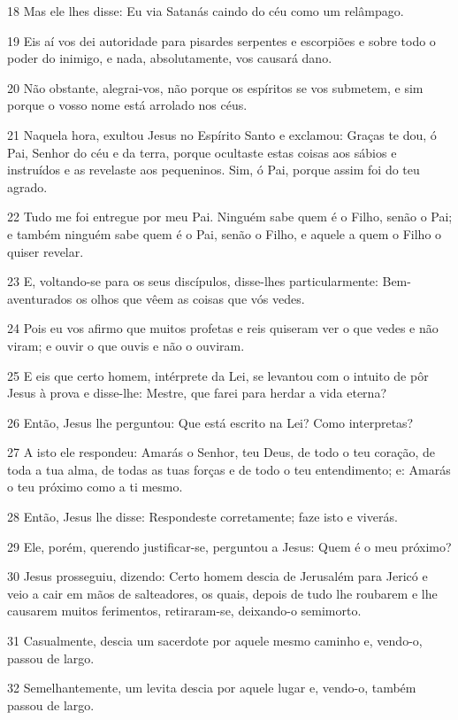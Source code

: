 \par 18 Mas ele lhes disse: Eu via Satanás caindo do céu como um relâmpago.
\par 19 Eis aí vos dei autoridade para pisardes serpentes e escorpiões e sobre todo o poder do inimigo, e nada, absolutamente, vos causará dano.
\par 20 Não obstante, alegrai-vos, não porque os espíritos se vos submetem, e sim porque o vosso nome está arrolado nos céus.
\par 21 Naquela hora, exultou Jesus no Espírito Santo e exclamou: Graças te dou, ó Pai, Senhor do céu e da terra, porque ocultaste estas coisas aos sábios e instruídos e as revelaste aos pequeninos. Sim, ó Pai, porque assim foi do teu agrado.
\par 22 Tudo me foi entregue por meu Pai. Ninguém sabe quem é o Filho, senão o Pai; e também ninguém sabe quem é o Pai, senão o Filho, e aquele a quem o Filho o quiser revelar.
\par 23 E, voltando-se para os seus discípulos, disse-lhes particularmente: Bem-aventurados os olhos que vêem as coisas que vós vedes.
\par 24 Pois eu vos afirmo que muitos profetas e reis quiseram ver o que vedes e não viram; e ouvir o que ouvis e não o ouviram.
\par 25 E eis que certo homem, intérprete da Lei, se levantou com o intuito de pôr Jesus à prova e disse-lhe: Mestre, que farei para herdar a vida eterna?
\par 26 Então, Jesus lhe perguntou: Que está escrito na Lei? Como interpretas?
\par 27 A isto ele respondeu: Amarás o Senhor, teu Deus, de todo o teu coração, de toda a tua alma, de todas as tuas forças e de todo o teu entendimento; e: Amarás o teu próximo como a ti mesmo.
\par 28 Então, Jesus lhe disse: Respondeste corretamente; faze isto e viverás.
\par 29 Ele, porém, querendo justificar-se, perguntou a Jesus: Quem é o meu próximo?
\par 30 Jesus prosseguiu, dizendo: Certo homem descia de Jerusalém para Jericó e veio a cair em mãos de salteadores, os quais, depois de tudo lhe roubarem e lhe causarem muitos ferimentos, retiraram-se, deixando-o semimorto.
\par 31 Casualmente, descia um sacerdote por aquele mesmo caminho e, vendo-o, passou de largo.
\par 32 Semelhantemente, um levita descia por aquele lugar e, vendo-o, também passou de largo.
